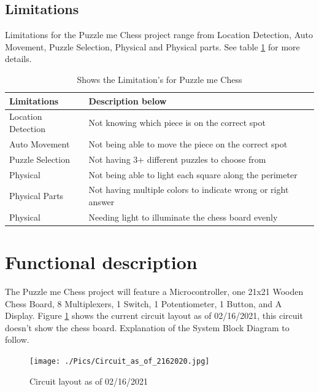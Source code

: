\documentclass[11pt]{article}
\begin{document}
 \newpage 
 
\subsection{Limitations}
Limitations for the Puzzle me Chess project range from Location Detection, Auto Movement, Puzzle Selection, Physical and Physical parts. See table \ref{tab:limitations} for more details.

\begin{table}[H]
\begin{center}
    \begin{tabular}{| l | l |}
    \hline
    Limitations  & Description below\\ \hline
    Location Detection & Not knowing which piece is on the correct spot \\ \hline
    Auto Movement & Not being able to move the piece on the correct spot \\ \hline 
    Puzzle Selection & Not having 3+ different puzzles to choose from  \\ \hline
    Physical & Not being able to light each square along the perimeter  \\ \hline
    Physical Parts & Not having multiple colors to indicate wrong or right answer \\ \hline
    Physical & Needing light to illuminate the chess board evenly \\ \hline
    \end{tabular}
    \caption{Shows the Limitation's for Puzzle me Chess}
	\label{tab:limitations}
\end{center}
\end{table}

\section{Functional description}
The Puzzle me Chess project will feature a Microcontroller, one 21x21 Wooden Chess Board, 8 Multiplexers, 1 Switch, 1 Potentiometer, 1 Button, and A Display. Figure \ref{fig:Circuit} shows  the current circuit layout as of 02/16/2021, this circuit doesn't show the chess board. Explanation of the System Block Diagram to follow.

\begin{figure}
  \texttt{[image: ./Pics/Circuit\_as\_of\_2162020.jpg]}
  \caption{Circuit layout as of 02/16/2021}
  \label{fig:Circuit}
\end{figure}
\end{document}
